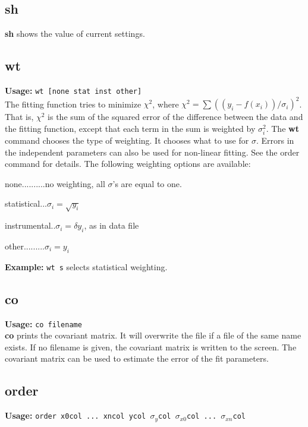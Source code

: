 \subsection{sh}

        {\bf sh} shows the value of current settings.

\subsection{wt}     {\bf Usage: } {\tt  wt [none stat inst other]} \\

        The fitting function tries to minimize $\chi^2$, where
 $\chi^2 = \sum {((y_i - f(x_i))/{\sigma}_i)}^2$.  That is, $\chi^2$
 is the sum of the squared error of the difference between 
 the data and the fitting function, except that each term in 
 the sum is weighted by $\sigma_i^2$.  The {\bf wt} command chooses
 the type of weighting.  It chooses what to use for $\sigma$.
 Errors in the independent parameters can also be used for
 non-linear fitting.  See the order command for details.
        The following weighting options are available:

 none..........no weighting, all $\sigma$'s are equal to one.

 statistical...$\sigma_i = \sqrt{y_i}$

 instrumental..$\sigma_i = \delta y_i$, as in data file

 other.........$\sigma_i = y_i$

        {\bf Example: } {\tt  wt s} selects statistical weighting.

\subsection{co}     {\bf Usage: } {\tt  co filename} \\

        {\bf co} prints the covariant matrix.  It will overwrite
 the file if a file of the same name exists.  If no filename
 is given, the covariant matrix is written to the screen. 
 The covariant matrix can be used to estimate the error of
 the fit parameters.

\subsection{order}   {\bf Usage: } {\tt  order x0col ... xncol ycol $\sigma_y$col $\sigma_{x0}$col ... $\sigma_{xn}$col}

